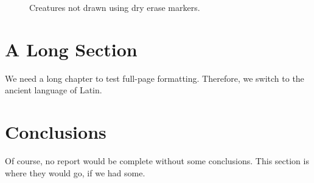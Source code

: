 \documentclass[pdf,ps2pdf,12pt]{smemo}
\begin{document}
\begin{memo}
\begin{figure}[!btp]
  \centering
  \caption{Creatures not drawn using dry erase markers.}
  \label{fig:creatures}
\end{figure}

\section{A Long Section}\label{sec:long}
We need a long chapter to test full-page formatting. Therefore, we
switch to the ancient language of Latin.



\section{Conclusions}
Of course, no report would be complete without some conclusions.
This section is where they would go, if we had some.


\end{memo}
\end{document}
